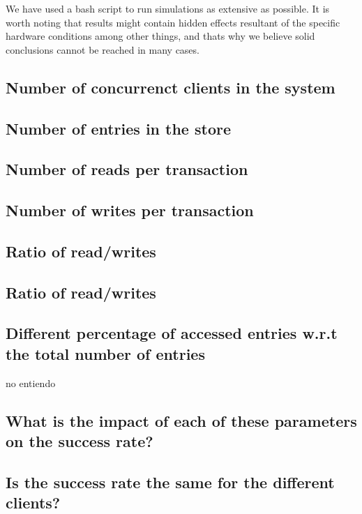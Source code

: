 \documentclass[a4paper, 10pt]{article}
\begin{document}
We have used a bash script to run simulations as extensive as possible. It is worth noting that results might contain hidden effects resultant of the specific hardware conditions among other things, and thats why we believe solid conclusions cannot be reached in many cases.

\subsection{Number of concurrenct clients in the system}
\label{sec:numclients}

\subsection{Number of entries in the store}
\label{sec:numentries}

\subsection{Number of reads per transaction}
\label{sec:numreads}

\subsection{Number of writes per transaction}
\label{sec:numwrites}

\subsection{Ratio of read/writes}
\label{sec:ratioreadwrites}

\subsection{Ratio of read/writes}
\label{sec:ratioreadwrites}

\subsection{Different percentage of accessed entries w.r.t the total number of entries}
\label{sec:nose}
no entiendo


\subsection{What is the impact of each of these parameters on the success rate?}

\subsection{Is the success rate the same for the different clients?}
\end{document}
